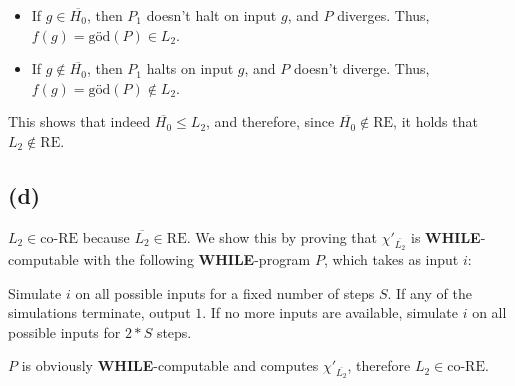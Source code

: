 \noindent

\begin{itemize}
    \item If $g \in \overline{H_0}$, then $P_1$ doesn’t halt on input $g$, and $P$ diverges. Thus, $f(g) = \text{göd}(P) \in L_2$.
    \item If $g \notin \overline{H_0}$, then $P_1$ halts on input $g$, and $P$ doesn’t diverge. Thus, $f(g) = \text{göd}(P) \notin L_2$.
\end{itemize}

This shows that indeed $\overline{H_0} \leq L_2$, and therefore, since $\overline{H_0} \notin \text{RE}$, it holds that $L_2 \notin \text{RE}$.

\bigskip
\bigskip

\subsection{(d)}
$L_2 \in \text{co-RE}$ because $\overline{L_2} \in \text{RE}$.  
We show this by proving that $\chi'_{\overline{L_2}}$ is \textbf{WHILE}-computable with the following \textbf{WHILE}-program $P$, which takes as input $i$:



\noindent
Simulate $i$ on all possible inputs for a fixed number of steps $S$.  
If any of the simulations terminate, output $1$.  
If no more inputs are available, simulate $i$ on all possible inputs for $2 * S$ steps.

\bigskip

\noindent
$P$ is obviously \textbf{WHILE}-computable and computes $\chi'_{\overline{L_2}}$,  
therefore $L_2 \in \text{co-RE}$.


